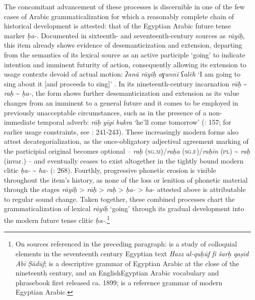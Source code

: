 \documentclass[output=paper]{langsci/langscibook}
\begin{document}
The concomitant advancement of these processes is discernible in one of the few cases of Arabic grammaticalization for which a reasonably complete chain of historical development is attested: that of the Egyptian Arabic future tense marker \textit{ḥ}\textit{a-}. Documented in sixteenth- and seventeenth-century sources as \textit{rāy}\textit{iḥ}, this item already shows evidence of desemanticization and extension, departing from the semantics of its lexical source as an active participle ‘going’ to indicate intention and imminent futurity of action, consequently allowing its extension to usage contexts devoid of actual motion: \textit{ʔan}\textit{ā} \textit{r}\textit{āyi}\textit{ḥ} \textit{aɣannī} \textit{ʕalēh} ‘I am going to sing about it [and proceeds to sing]’ \citep[241]{Davies1981}. In its nineteenth-century incarnation \textit{rāḥ} {\textasciitilde} \textit{raḥ} {\textasciitilde} \textit{ḥa-}, the form shows further desemanticization and extension as its value changes from an imminent to a general future and it comes to be employed in previously unacceptable circumstances, such as in the presence of a non-immediate temporal adverb: \textit{rāḥ} \textit{yīgi} \textit{bukra} ‘he’ll come tomorrow’ (\citealt{Elias1981}: 157; for earlier usage constraints, see \citealt{Davies1981}: 241-243). These increasingly modern forms also attest decategorialization, as the once-obligatory adjectival agreement marking of the participial original becomes optional – \textit{raḥ} (\textsc{sg.m})/\textit{raḥ}\textit{a} (\textsc{sg.f})/\textit{raḥī}\textit{n} (\textsc{pl}) {\textasciitilde} \textit{raḥ} (invar.) \citep[40]{Vollers1895} – and eventually ceases to exist altogether in the tightly bound modern clitic \textit{ḥa-} {\textasciitilde} \textit{ha-} (\citealt{Abdel-Massih2009}: 268). Fourthly, progressive phonetic erosion is visible throughout the item’s history, as none of the loss or lenition of phonetic material through the stages \textit{rāyiḥ} > \textit{rāḥ} > \textit{raḥ} > \textit{ḥa-} > \textit{ha-} attested above is attributable to regular sound change. Taken together, these combined processes chart the grammaticalization of lexical \textit{rāyiḥ} ‘going’ through its gradual development into the modern future tense clitic \textit{ḥa-}.\footnote{On sources referenced in the preceding paragraph: \citet{Davies1981} is a study of colloquial elements in the seventeenth century Egyptian text \textit{Hazz} \textit{al-quḥūf} \textit{fī} \textit{šarḥ} \textit{qaṣīd} \textit{Abī} \textit{Ṣādūf}; \citet{Vollers1895} is a descriptive grammar of Egyptian Arabic at the close of the nineteenth century, and \citet{Elias1981} an English\textendash Egyptian Arabic vocabulary and phrasebook first released ca. 1899;  \citet{Abdel-Massih2009} is a reference grammar of modern Egyptian Arabic.}
\end{document}
